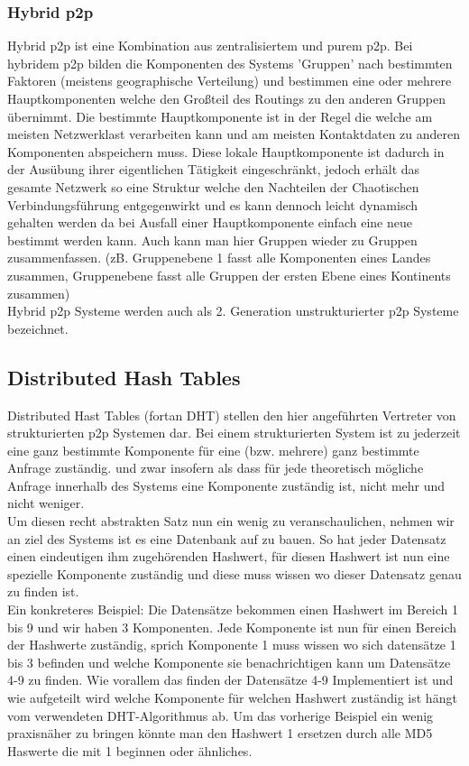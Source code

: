 \documentclass[a4paper,12pt]{scrreprt}
\begin{document}
				\subsubsection{Hybrid p2p}
				
					Hybrid p2p ist eine Kombination aus zentralisiertem und purem p2p. Bei hybridem p2p bilden die Komponenten des Systems 'Gruppen' nach bestimmten Faktoren (meistens geographische Verteilung) und bestimmen eine oder mehrere Hauptkomponenten welche den Großteil des Routings zu den anderen Gruppen übernimmt. Die bestimmte Hauptkomponente ist in der Regel die welche am meisten Netzwerklast verarbeiten kann und am meisten Kontaktdaten zu anderen Komponenten abspeichern muss. Diese lokale Hauptkomponente ist dadurch in der Ausübung ihrer eigentlichen Tätigkeit eingeschränkt, jedoch erhält das gesamte Netzwerk so eine Struktur welche den Nachteilen der Chaotischen Verbindungsführung entgegenwirkt und es kann dennoch leicht dynamisch gehalten werden da bei Ausfall einer Hauptkomponente einfach eine neue bestimmt werden kann. Auch kann man hier Gruppen wieder zu Gruppen zusammenfassen. (zB. Gruppenebene 1 fasst alle Komponenten eines Landes zusammen, Gruppenebene fasst alle Gruppen der ersten Ebene eines Kontinents zusammen)\\
					Hybrid p2p Systeme werden auch als 2. Generation unstrukturierter p2p Systeme bezeichnet.
					
			\subsection{Distributed Hash Tables}
				
				Distributed Hast Tables (fortan DHT) stellen den hier angeführten Vertreter von strukturierten p2p Systemen dar. Bei einem strukturierten System ist zu jederzeit eine ganz bestimmte Komponente für eine (bzw. mehrere) ganz bestimmte Anfrage zuständig. und zwar insofern als dass für jede theoretisch mögliche Anfrage innerhalb des Systems eine Komponente zuständig ist, nicht mehr und nicht weniger. \\Um diesen recht abstrakten Satz nun ein wenig zu veranschaulichen, nehmen wir an ziel des Systems ist es eine Datenbank auf zu bauen. So hat jeder Datensatz einen eindeutigen ihm zugehörenden Hashwert, für diesen Hashwert ist nun eine spezielle Komponente zuständig und diese muss wissen wo dieser Datensatz genau zu finden ist. \\ Ein konkreteres Beispiel: Die Datensätze bekommen einen Hashwert im Bereich 1 bis 9 und wir haben 3 Komponenten. Jede Komponente ist nun für einen Bereich der Hashwerte zuständig, sprich Komponente 1 muss wissen wo sich datensätze 1 bis 3 befinden und welche Komponente sie benachrichtigen kann um Datensätze 4-9 zu finden. Wie vorallem das finden der Datensätze 4-9 Implementiert ist und wie aufgeteilt wird welche Komponente für welchen Hashwert zuständig ist hängt vom verwendeten DHT-Algorithmus ab. Um das vorherige Beispiel ein wenig praxisnäher zu bringen könnte man den Hashwert 1 ersetzen durch alle MD5 Haswerte die mit 1 beginnen oder ähnliches.
				
\end{document}
